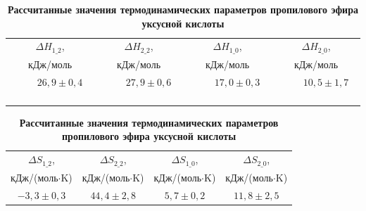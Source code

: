 \begin{table}

\centering

\begin{minipage} [t]{12cm}

\caption{\small \bfseries Рассчитанные значения термодинамических параметров пропилового эфира уксусной кислоты}

\vspace{-3mm}

\begin{tabular}{c|c|c|c}

\hline

$\Delta H_{1\_2}$, & 

$\Delta H_{2\_2}$, & 

$\Delta H_{1\_0}$, & 

$\Delta H_{2\_0}$, \\

кДж/моль& 

кДж/моль& 

кДж/моль& 

кДж/моль\\

\hline

~~~~$26{,}9\pm 0{,}4$~~~~& 

~~~~$27{,}9\pm 0{,}6$~~~~& 

~~~~$17{,}0\pm 0{,}3$~~~~& 

~~~~$10{,}5\pm 1{,}7$~~~~\\

\hline

\end{tabular}



\smallskip

\begin{tabular}{c|c|c|c}

\hline$\Delta S_{1\_2}$, & 

$\Delta S_{2\_2}$, & 

$\Delta S_{1\_0}$, & 

$\Delta S_{2\_0}$, \\ 

кДж/(моль$\cdot $K)& 

кДж/(моль$\cdot $K)& 

кДж/(моль$\cdot $K)& 

кДж/(моль$\cdot $K)\\

\hline

$-3{,}3\pm 0{,}3$& 

$44{,}4\pm 2{,}8$& 

$5{,}7\pm 0{,}2$& 

$11{,}8\pm 2{,}5$ \\

\hline

\end{tabular}

\end{minipage}

\end{table}



